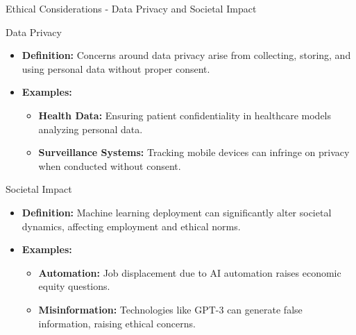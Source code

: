 \documentclass[aspectratio=169]{beamer}
\begin{document}
\begin{frame}[fragile]{Ethical Considerations - Data Privacy and Societal Impact}
    \begin{block}{Data Privacy}
        \begin{itemize}
            \item \textbf{Definition:} Concerns around data privacy arise from collecting, storing, and using personal data without proper consent.
            \item \textbf{Examples:}
                \begin{itemize}
                    \item \textbf{Health Data:} Ensuring patient confidentiality in healthcare models analyzing personal data.
                    \item \textbf{Surveillance Systems:} Tracking mobile devices can infringe on privacy when conducted without consent.
                \end{itemize}
        \end{itemize}
    \end{block}

    \begin{block}{Societal Impact}
        \begin{itemize}
            \item \textbf{Definition:} Machine learning deployment can significantly alter societal dynamics, affecting employment and ethical norms.
            \item \textbf{Examples:}
                \begin{itemize}
                    \item \textbf{Automation:} Job displacement due to AI automation raises economic equity questions.
                    \item \textbf{Misinformation:} Technologies like GPT-3 can generate false information, raising ethical concerns.
                \end{itemize}
        \end{itemize}
    \end{block}
\end{frame}
\end{document}
